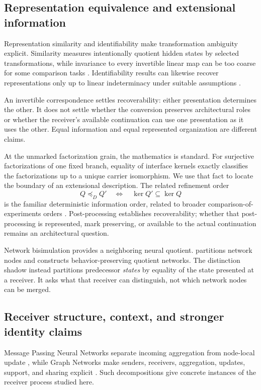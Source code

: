 \subsection{Representation equivalence and extensional information}

Representation similarity and identifiability make transformation ambiguity explicit. Similarity measures intentionally quotient hidden states by selected transformations, while invariance to every invertible linear map can be too coarse for some comparison tasks \citep{kornblith2019similarity}. Identifiability results can likewise recover representations only up to linear indeterminacy under suitable assumptions \citep{roeder2021linear}.

An invertible correspondence settles recoverability: either presentation determines the other. It does not settle whether the conversion preserves architectural roles or whether the receiver's available continuation can use one presentation as it uses the other. Equal information and equal represented organization are different claims.

At the unmarked factorization grain, the mathematics is standard. For surjective factorizations of one fixed branch, equality of interface kernels exactly classifies the factorizations up to a unique carrier isomorphism. We use that fact to locate the boundary of an extensional description. The related refinement order
\[
Q\preceq_DQ'
\quad\Longleftrightarrow\quad
\ker Q'\subseteq\ker Q
\]
is the familiar deterministic information order, related to broader comparison-of-experiments orders \citep{blackwell1951comparison}. Post-processing establishes recoverability; whether that post-processing is represented, mark preserving, or available to the actual continuation remains an architectural question.

Network bisimulation provides a neighboring neural quotient. \citet{prabhakar2022bisimulations} partitions network nodes and constructs behavior-preserving quotient networks. The distinction shadow instead partitions predecessor \emph{states} by equality of the state presented at a receiver. It asks what that receiver can distinguish, not which network nodes can be merged.

\subsection{Receiver structure, context, and stronger identity claims}

Message Passing Neural Networks separate incoming aggregation from node-local update \citep{gilmer2017neural}, while Graph Networks make senders, receivers, aggregation, updates, support, and sharing explicit \citep{battaglia2018relational}. Such decompositions give concrete instances of the receiver process studied here.

